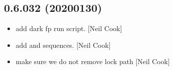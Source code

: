\documentclass[a4paper,10pt,english]{report}
\begin{document}
\subsection{0.6.032 (2020\sphinxhyphen{}01\sphinxhyphen{}30)}
\label{\detokenize{misc/changelog:id6}}\begin{itemize}
\item {} 
 \sphinxhyphen{} add dark fp run script. {[}Neil Cook{]}

\item {} 
 \sphinxhyphen{} add  and
 sequences. {[}Neil Cook{]}

\item {} 
 \sphinxhyphen{} make sure we do not remove lock path
 {[}Neil Cook{]}

\end{itemize}
\end{document}
